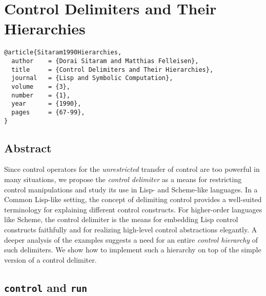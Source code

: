 \documentclass[letterpaper]{llncs}
\newcommand{\createop}[1]{\texttt{#1}\xspace}
\newcommand{\ctrl}{\createop{control}}
\newcommand{\run}{\createop{run}}
\begin{document}
\section*{Control Delimiters and Their Hierarchies}%

\begin{verbatim}
@article{Sitaram1990Hierarchies,
  author    = {Dorai Sitaram and Matthias Felleisen},
  title     = {Control Delimiters and Their Hierarchies},
  journal   = {Lisp and Symbolic Computation},
  volume    = {3},
  number    = {1},
  year      = {1990},
  pages     = {67-99},
}
\end{verbatim}

\subsection*{Abstract}
Since control operators for the \textit{unrestricted} transfer of control are too powerful in many situations, we propose the \textit{control delimiter} as a means for restricting control manipulations and study its use in Lisp- and Scheme-like languages. In a Common Lisp-like setting, the concept of delimiting control provides a well-suited terminology for explaining different control constructs. For higher-order languages like Scheme, the control delimiter is the means for embedding Lisp control constructs faithfully and for realizing high-level control abstractions elegantly. A deeper analysis of the examples suggests a need for an entire \textit{control hierarchy} of such delimiters. We show how to implement such a hierarchy on top of the simple version of a control delimiter.

\subsection*{\ctrl and \run}
\end{document}
